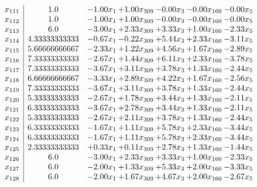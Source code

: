 \documentclass[8pt]{article}
\begin{document}
\[\begin{array}{c| c c@{\hskip 2pt} c@{\hskip 2pt} c@{\hskip 2pt} c@{\hskip 2pt} c@{\hskip 2pt} }
 x_{111}   &  1.0 & -1.00 x_{1} & +  1.00 x_{309} & -0.00 x_{3} & -0.00 x_{160} & -0.00 x_{5}\\
 x_{112}   &  1.0 & -1.00 x_{1} & +  1.00 x_{309} & -0.00 x_{3} & -0.00 x_{160} & -0.00 x_{5}\\
 x_{113}   &  6.0 & -3.00 x_{1} & +  2.33 x_{309} & +  3.33 x_{3} & +  1.00 x_{160} & -2.33 x_{5}\\
 x_{114}   &  4.33333333333 & -0.67 x_{1} & -0.22 x_{309} & +  5.44 x_{3} & +  2.33 x_{160} & -3.11 x_{5}\\
 x_{115}   &  5.66666666667 & -2.33 x_{1} & +  1.22 x_{309} & +  4.56 x_{3} & +  1.67 x_{160} & -2.89 x_{5}\\
 x_{116}   &  7.33333333333 & -2.67 x_{1} & +  1.44 x_{309} & +  6.11 x_{3} & +  2.33 x_{160} & -3.78 x_{5}\\
 x_{117}   &  7.33333333333 & -3.67 x_{1} & +  3.11 x_{309} & +  3.78 x_{3} & +  1.33 x_{160} & -2.44 x_{5}\\
 x_{118}   &  6.66666666667 & -3.33 x_{1} & +  2.89 x_{309} & +  4.22 x_{3} & +  1.67 x_{160} & -2.56 x_{5}\\
 x_{119}   &  7.33333333333 & -3.67 x_{1} & +  3.11 x_{309} & +  3.78 x_{3} & +  1.33 x_{160} & -2.44 x_{5}\\
 x_{120}   &  5.33333333333 & -2.67 x_{1} & +  1.78 x_{309} & +  3.44 x_{3} & +  1.33 x_{160} & -2.11 x_{5}\\
 x_{121}   &  6.33333333333 & -3.67 x_{1} & +  2.78 x_{309} & +  3.44 x_{3} & +  1.33 x_{160} & -2.11 x_{5}\\
 x_{122}   &  5.33333333333 & -2.67 x_{1} & +  2.11 x_{309} & +  3.78 x_{3} & +  1.33 x_{160} & -2.44 x_{5}\\
 x_{123}   &  6.33333333333 & -1.67 x_{1} & +  1.11 x_{309} & +  5.78 x_{3} & +  2.33 x_{160} & -3.44 x_{5}\\
 x_{124}   &  6.33333333333 & -1.67 x_{1} & +  1.11 x_{309} & +  5.78 x_{3} & +  2.33 x_{160} & -3.44 x_{5}\\
 x_{125}   &  2.33333333333 & +  0.33 x_{1} & +  0.11 x_{309} & +  2.78 x_{3} & +  1.33 x_{160} & -1.44 x_{5}\\
 x_{126}   &  6.0 & -3.00 x_{1} & +  2.33 x_{309} & +  3.33 x_{3} & +  1.00 x_{160} & -2.33 x_{5}\\
 x_{127}   &  6.0 & -2.00 x_{1} & +  1.33 x_{309} & +  5.33 x_{3} & +  2.00 x_{160} & -3.33 x_{5}\\
 x_{128}   &  6.0 & -2.00 x_{1} & +  1.67 x_{309} & +  4.67 x_{3} & +  2.00 x_{160} & -2.67 x_{5}\\

\end{array}\]
\end{document}

